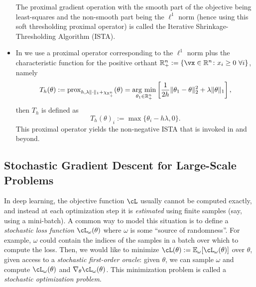 \documentclass[../../book-main.tex]{subfiles}
\begin{document}
\begin{itemize}
    The proximal gradient operation with the smooth part of the objective being least-squares and the non-smooth part being the \(\ell^{1}\) norm (hence using this soft thresholding proximal operator) is called the Iterative Shrinkage-Thresholding Algorithm (ISTA).
    \item In  we use a proximal operator corresponding to the \(\ell^{1}\) norm plus the characteristic function for the positive orthant \(\R_{+}^{n} := \{\vx \in \R^{n} \colon x_{i} \geq 0\ \forall i\}\), namely
    \begin{equation}
        T_{h}(\theta) := \prox_{h, \lambda\norm{\cdot}_{1} + \chi_{\R_{+}^{n}}}(\theta) = \argmin_{\theta_{1} \in \R_{+}^{n}}\bs{\frac{1}{2h}\norm{\theta_{1} - \theta}_{2}^{2} + \lambda\norm{\theta}_{1}},
    \end{equation}
    then \(T_{h}\) is defined as 
    \begin{equation}
        T_{h}(\theta)_{i} := \max\{\theta_{i} - h\lambda, 0\}.
    \end{equation}
    This proximal operator yields the non-negative ISTA that is invoked in  and beyond.
\end{itemize}


\subsection{Stochastic Gradient Descent for Large-Scale Problems}


In deep learning, the objective function \(\cL\) usually cannot be computed exactly, and instead at each optimization step it is \textit{estimated} using finite samples (say, using a mini-batch). A common way to model this situation is to define a \textit{stochastic loss function} \(\cL_{\omega}(\theta)\) where \(\omega\) is some ``source of randomness''. For example, \(\omega\) could contain the indices of the samples in a batch over which to compute the loss. Then, we would like to minimize \(\cL(\theta) := \Ex_{\omega}[\cL_{\omega}(\theta)]\) over \(\theta\), given access to a \textit{stochastic first-order oracle}: given \(\theta\), we can sample \(\omega\) and compute \(\cL_{\omega}(\theta)\) and \(\nabla_{\theta}\cL_{\omega}(\theta)\). This minimization problem is called a \textit{stochastic optimization problem}.
\end{document}
